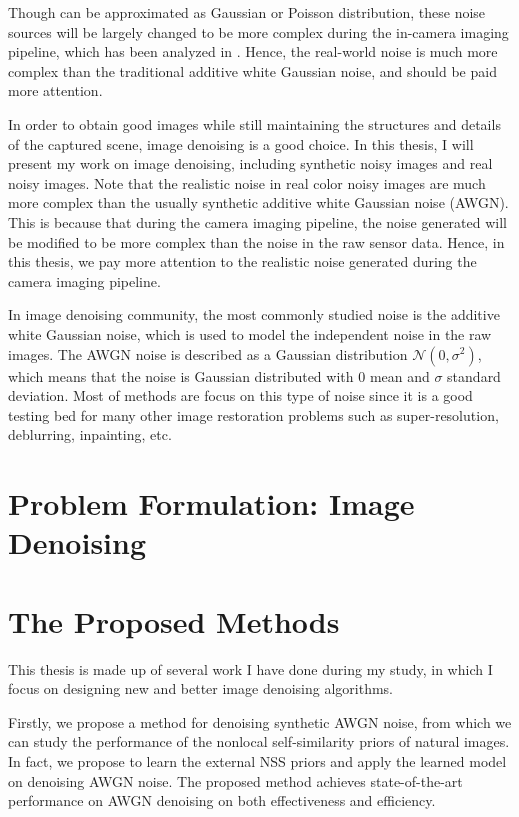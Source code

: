 Though can be approximated as Gaussian or Poisson distribution, these noise sources will be largely changed to be more complex during the in-camera imaging pipeline, which has been analyzed in \cite{crosschannel}. Hence, the real-world noise is much more complex than the traditional additive white Gaussian noise, and should be paid more attention.

In order to obtain good images while still maintaining the structures and details of the captured scene, image denoising is a good choice. In this thesis, I will present my work on image denoising, including synthetic noisy images and real noisy images. Note that the realistic noise in real color noisy images are much more complex than the usually synthetic additive white Gaussian noise (AWGN). This is because that during the camera imaging pipeline, the noise generated will be modified to be more complex than the noise in the raw sensor data. Hence, in this thesis, we pay more attention to the realistic noise generated during the camera imaging pipeline. 

In image denoising community, the most commonly studied noise is the additive white Gaussian noise, which is used to model the independent noise in the raw images. The AWGN noise is described as a Gaussian distribution $\mathcal{N}(0,\sigma^{2})$, which means that the noise is Gaussian distributed with $0$ mean and $\sigma$ standard deviation. Most of methods are focus on this type of noise since it is a good testing bed for many other image restoration problems such as super-resolution, deblurring, inpainting, etc.

\section{Problem Formulation: Image Denoising}

\section{The Proposed Methods}
\label{sec:intro:new}

This thesis is made up of several work I have done during my study, in which I focus on designing new and better image denoising algorithms. 

Firstly, we propose a method for denoising synthetic AWGN noise, from which we can study the performance of the nonlocal self-similarity priors of natural images. In fact, we propose to learn the external NSS priors and apply the learned model on denoising AWGN noise. The proposed method achieves state-of-the-art performance on AWGN denoising on both effectiveness and efficiency. 

